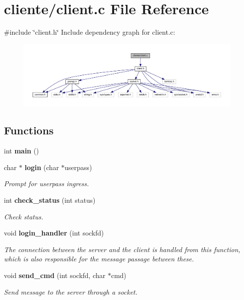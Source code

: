 \section{cliente/client.c File Reference}
\label{client_8c}
{\ttfamily \#include \char`\"{}client.\+h\char`\"{}}\newline
Include dependency graph for client.\+c\+:
\nopagebreak
\begin{figure}[H]
\begin{center}
\leavevmode
\includegraphics[width=350pt]{client_8c__incl}
\end{center}
\end{figure}
\subsection*{Functions}
\begin{DoxyCompactItemize}
\item 
int \textbf{ main} ()
\item 
char $\ast$ \textbf{ login} (char $\ast$userpass)
\begin{DoxyCompactList}\small\item\em Prompt for userpass ingress. \end{DoxyCompactList}\item 
int \textbf{ check\+\_\+status} (int status)
\begin{DoxyCompactList}\small\item\em Check status. \end{DoxyCompactList}\item 
void \textbf{ login\+\_\+handler} (int sockfd)
\begin{DoxyCompactList}\small\item\em The connection between the server and the client is handled from this function, which is also responsible for the message passage between these. \end{DoxyCompactList}\item 
void \textbf{ send\+\_\+cmd} (int sockfd, char $\ast$cmd)
\begin{DoxyCompactList}\small\item\em Send message to the server through a socket. \end{DoxyCompactList}\end{DoxyCompactItemize}


